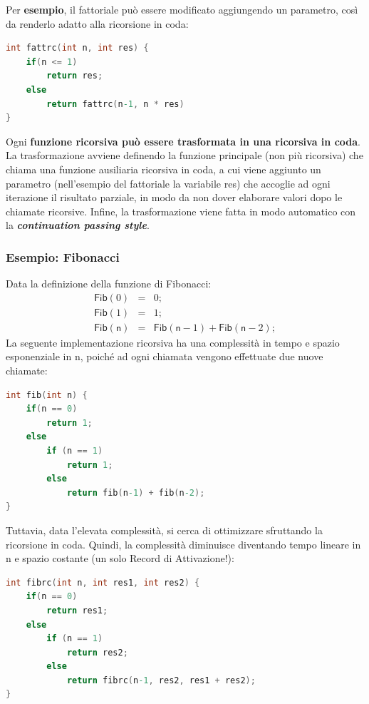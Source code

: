 \documentclass[a4paper]{article}
\begin{document}
	\noindent
	Per \textcolor{Green4}{\textbf{esempio}}, il fattoriale può essere modificato aggiungendo un parametro, così da renderlo adatto alla ricorsione in coda:
	\begin{lstlisting}[language=C]
int fattrc(int n, int res) {
	if(n <= 1)
		return res;
	else
		return fattrc(n-1, n * res)
}
	\end{lstlisting}
	Ogni \textbf{funzione ricorsiva può essere trasformata in una ricorsiva in coda}. La trasformazione avviene definendo la funzione principale (non più ricorsiva) che chiama una funzione ausiliaria ricorsiva in coda, a cui viene aggiunto un parametro (nell'esempio del fattoriale la variabile \textsf{res}) che accoglie ad ogni iterazione il risultato parziale, in modo da non dover elaborare valori dopo le chiamate ricorsive. Infine, la trasformazione viene fatta in modo automatico con la \textbf{\emph{continuation passing style}}.\newpage
	
	\subsubsection{Esempio: Fibonacci}
	
	Data la definizione della funzione di Fibonacci:
	\begin{equation*}
		\begin{array}{lll}
			\textsf{Fib}\left(0\right) &=& 0; \\
			\textsf{Fib}\left(1\right) &=& 1; \\
			\textsf{Fib}\left(\textsf{n}\right) &=& \textsf{Fib}\left(\textsf{n} - 1\right) + \textsf{Fib}\left(\textsf{n} - 2\right);
		\end{array}
	\end{equation*}
	La seguente implementazione ricorsiva ha una complessità in tempo e spazio esponenziale in \textsf{n}, poiché ad ogni chiamata vengono effettuate due nuove chiamate:
	\begin{lstlisting}[language=C]
int fib(int n) {
	if(n == 0)
		return 1;
	else
		if (n == 1)
			return 1;
		else
			return fib(n-1) + fib(n-2);
}\end{lstlisting}
	Tuttavia, data l'elevata complessità, si cerca di ottimizzare sfruttando la ricorsione in coda. Quindi, la complessità diminuisce diventando tempo lineare in \textsf{n} e spazio costante (un solo Record di Attivazione!):
	\begin{lstlisting}[language=C]
int fibrc(int n, int res1, int res2) {
	if(n == 0)
		return res1;
	else
		if (n == 1)
			return res2;
		else
			return fibrc(n-1, res2, res1 + res2);
}\end{lstlisting}
\end{document}
